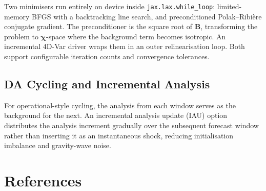 \documentclass[11pt,a4paper]{article}
\begin{document}
Two minimisers run entirely on device inside \texttt{jax.lax.while\_loop}: limited-memory BFGS with a backtracking line search, and preconditioned Polak--Ribi\`ere conjugate gradient.  The preconditioner is the square root of $\bm B$, transforming the problem to $\bm\chi$-space where the background term becomes isotropic.  An incremental 4D-Var driver wraps them in an outer relinearisation loop.  Both support configurable iteration counts and convergence tolerances.

\subsection{DA Cycling and Incremental Analysis}

For operational-style cycling, the analysis from each window serves as the background for the next.  An incremental analysis update (IAU) option distributes the analysis increment gradually over the subsequent forecast window rather than inserting it as an instantaneous shock, reducing initialisation imbalance and gravity-wave noise.

\section{References}
\end{document}
